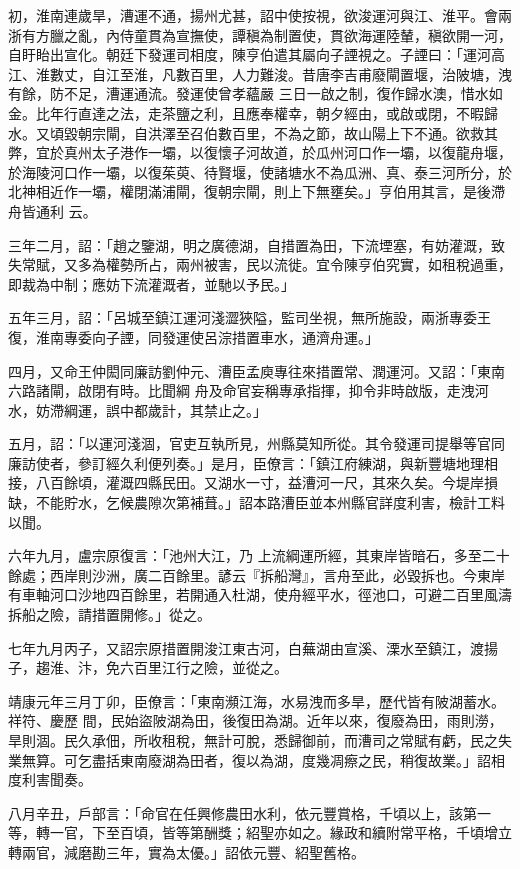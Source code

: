 \begin{pinyinscope}
 初，淮南連歲旱，漕運不通，揚州尤甚，詔中使按視，欲浚運河與江、淮平。會兩浙有方臘之亂，內侍童貫為宣撫使，譚稹為制置使，貫欲海運陸輦，稹欲開一河，自盱眙出宣化。朝廷下發運司相度，陳亨伯遣其屬向子諲視之。子諲曰：「運河高江、淮數丈，自江至淮，凡數百里，人力難浚。昔唐李吉甫廢閘置堰，治陂塘，洩有餘，防不足，漕運通流。發運使曾孝蘊嚴
 三日一啟之制，復作歸水澳，惜水如金。比年行直達之法，走茶鹽之利，且應奉權幸，朝夕經由，或啟或閉，不暇歸水。又頃毀朝宗閘，自洪澤至召伯數百里，不為之節，故山陽上下不通。欲救其弊，宜於真州太子港作一壩，以復懷子河故道，於瓜州河口作一壩，以復龍舟堰，於海陵河口作一壩，以復茱萸、待賢堰，使諸塘水不為瓜洲、真、泰三河所分，於北神相近作一壩，權閉滿浦閘，復朝宗閘，則上下無壅矣。」亨伯用其言，是後滯舟皆通利
 云。



 三年二月，詔：「趙之鑒湖，明之廣德湖，自措置為田，下流堙塞，有妨灌溉，致失常賦，又多為權勢所占，兩州被害，民以流徙。宜令陳亨伯究實，如租稅過重，即裁為中制；應妨下流灌溉者，並馳以予民。」



 五年三月，詔：「呂城至鎮江運河淺澀狹隘，監司坐視，無所施設，兩浙專委王復，淮南專委向子諲，同發運使呂淙措置車水，通濟舟運。」



 四月，又命王仲閎同廉訪劉仲元、漕臣孟庾專往來措置常、潤運河。又詔：「東南六路諸閘，啟閉有時。比聞綱
 舟及命官妄稱專承指揮，抑令非時啟版，走洩河水，妨滯綱運，誤中都歲計，其禁止之。」



 五月，詔：「以運河淺涸，官吏互執所見，州縣莫知所從。其令發運司提舉等官同廉訪使者，參訂經久利便列奏。」是月，臣僚言：「鎮江府練湖，與新豐塘地理相接，八百餘頃，灌溉四縣民田。又湖水一寸，益漕河一尺，其來久矣。今堤岸損缺，不能貯水，乞候農隙次第補葺。」詔本路漕臣並本州縣官詳度利害，檢計工料以聞。



 六年九月，盧宗原復言：「池州大江，乃
 上流綱運所經，其東岸皆暗石，多至二十餘處；西岸則沙洲，廣二百餘里。諺云『拆船灣』，言舟至此，必毀拆也。今東岸有車軸河口沙地四百餘里，若開通入杜湖，使舟經平水，徑池口，可避二百里風濤拆船之險，請措置開修。」從之。



 七年九月丙子，又詔宗原措置開浚江東古河，白蕪湖由宣溪、溧水至鎮江，渡揚子，趨淮、汴，免六百里江行之險，並從之。



 靖康元年三月丁卯，臣僚言：「東南瀕江海，水易洩而多旱，歷代皆有陂湖蓄水。祥符、慶歷
 間，民始盜陂湖為田，後復田為湖。近年以來，復廢為田，雨則澇，旱則涸。民久承佃，所收租稅，無計可脫，悉歸御前，而漕司之常賦有虧，民之失業無算。可乞盡括東南廢湖為田者，復以為湖，度幾凋瘵之民，稍復故業。」詔相度利害聞奏。



 八月辛丑，戶部言：「命官在任興修農田水利，依元豐賞格，千頃以上，該第一等，轉一官，下至百頃，皆等第酬獎；紹聖亦如之。緣政和續附常平格，千頃增立轉兩官，減磨勘三年，實為太優。」詔依元豐、紹聖舊格。



\end{pinyinscope}